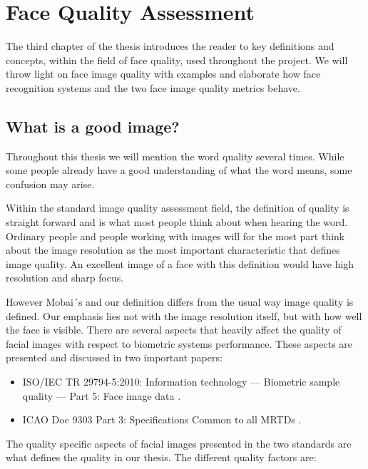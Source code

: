 \chapter{Face Quality Assessment}
\label{chap:FQA}
The third chapter of the thesis introduces the reader to key definitions and concepts, within the field of face quality, used throughout the project. We will throw light on face image quality with examples and elaborate how face recognition systems and the two face image quality metrics behave.  

\section{What is a good image?}
\label{sec:setup}
Throughout this thesis we will mention the word quality several times. While some people already have a good understanding of what the word means, some confusion may arise. 

Within the standard image quality assessment field, the definition of quality is straight forward and is what most people think about when hearing the word. Ordinary people and people working with images will for the most part think about the image resolution as the most important characteristic that defines image quality. An excellent image of a face with this definition would have high resolution and sharp focus.   

However Mobai´s and our definition differs from the usual way image quality is defined. Our emphasis lies not with the image resolution itself, but with how well the face is visible. There are several aspects that heavily affect the quality of facial images with respect to biometric systems performance. These aspects are presented and discussed in two important papers: 
%
\begin{itemize}
    \item ISO/IEC TR 29794-5:2010: Information technology — Biometric sample quality — Part 5: Face image data \cite{ISO50912}.
    \item ICAO Doc 9303 Part 3: Specifications Common to all MRTDs \cite{ICAO1}. 
\end{itemize}
%
The quality specific aspects of facial images presented in the two standards are what defines the quality in our thesis. The different quality factors are:  


